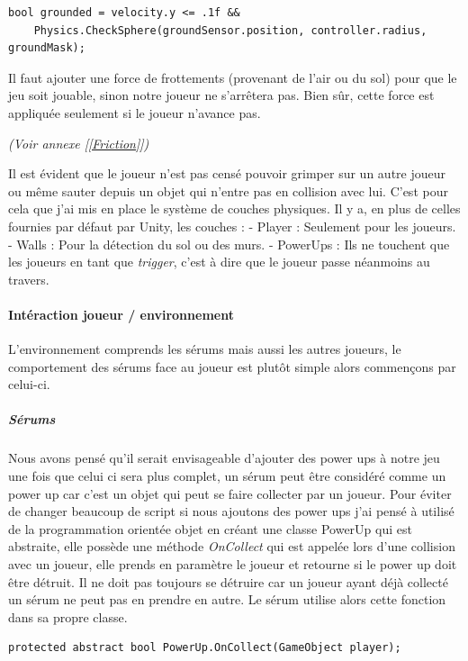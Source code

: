 \documentclass{article}
\begin{document}
\begin{lstlisting}
bool grounded = velocity.y <= .1f &&
	Physics.CheckSphere(groundSensor.position, controller.radius, groundMask);
\end{lstlisting}

Il faut ajouter une force de frottements (provenant de l'air ou du sol) pour que le jeu soit jouable, sinon notre joueur ne s'arrêtera pas. Bien sûr, cette force est appliquée seulement si le joueur n'avance pas.

\emph{(Voir annexe [\ref{Friction}])}

Il est évident que le joueur n'est pas censé pouvoir grimper sur un autre joueur ou même sauter depuis un objet qui n'entre pas en collision avec lui. C'est pour cela que j'ai mis en place le système de couches physiques. Il y a, en plus de celles fournies par défaut par Unity, les couches :
- Player : Seulement pour les joueurs.
- Walls : Pour la détection du sol ou des murs.
- PowerUps : Ils ne touchent que les joueurs en tant que \emph{trigger}, c'est à dire que le joueur passe néanmoins au travers.

\paragraph{Intéraction joueur / environnement}

L'environnement comprends les sérums mais aussi les autres joueurs, le comportement des sérums face au joueur est plutôt simple alors commençons par celui-ci.

\subparagraph{Sérums}

Nous avons pensé qu'il serait envisageable d'ajouter des power ups à notre jeu une fois que celui ci sera plus complet, un sérum peut être considéré comme un power up car c'est un objet qui peut se faire collecter par un joueur. Pour éviter de changer beaucoup de script si nous ajoutons des power ups j'ai pensé à utilisé de la programmation orientée objet en créant une classe PowerUp qui est abstraite, elle possède une méthode \emph{OnCollect} qui est appelée lors d'une collision avec un joueur, elle prends en paramètre le joueur et retourne si le power up doit être détruit. Il ne doit pas toujours se détruire car un joueur ayant déjà collecté un sérum ne peut pas en prendre en autre. Le sérum utilise alors cette fonction dans sa propre classe.

\begin{lstlisting}
protected abstract bool PowerUp.OnCollect(GameObject player);
\end{lstlisting}
\end{document}
